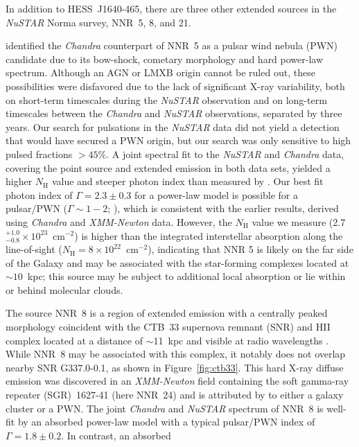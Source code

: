 \documentclass[iop,revtex4]{emulateapj}
\begin{document}
In addition to HESS~J1640-465, there are three other extended sources in the \textit{NuSTAR} Norma survey, NNR~5, 8, and 21.  \par
\citet{jakobsen14} identified the \textit{Chandra} counterpart of NNR~5 as a pulsar wind nebula (PWN) candidate due to its bow-shock, cometary morphology and hard power-law spectrum.  Although an AGN or LMXB origin cannot be ruled out, these possibilities were disfavored due to the lack of significant X-ray variability, both on short-term timescales during the \textit{NuSTAR} observation and on long-term timescales between the \textit{Chandra} and \textit{NuSTAR} observations, separated by three years.  Our search for pulsations in the \textit{NuSTAR} data did not yield a detection that would have secured a PWN origin, but our search was only sensitive to high pulsed fractions $>45$\%. A joint spectral fit to the \textit{NuSTAR} and \textit{Chandra} data, covering the point source and extended emission in both data sets, yielded a higher $N_{\mathrm{H}}$ value and steeper photon index than measured by \citet{jakobsen14}.  Our best fit photon index of $\Gamma=2.3\pm0.3$ for a power-law model is possible for a pulsar/PWN ($\Gamma\sim1-2$; \citealt{kargaltsev08}), which is consistent with the earlier results, derived using \textit{Chandra} and \textit{XMM-Newton} data.  However, the $N_{\mathrm{H}}$ value we measure (2.7$^{+1.0}_{-0.8}\times10^{23}$~cm$^{-2}$) is higher than the integrated interstellar absorption along the line-of-sight ($N_{\mathrm{H}} = 8\times10^{22}$~cm$^{-2}$), indicating that NNR 5 is likely on the far side of the Galaxy and may be associated with the star-forming complexes located at $\sim10$~kpc; this source may be subject to additional local absorption or lie within or behind molecular clouds. \par
The source NNR~8 is a region of extended emission with a centrally peaked morphology coincident with the CTB~33 supernova remnant (SNR) and H{\small II} complex located at a distance of $\sim$11~kpc and visible at radio wavelengths \citep{sarma97}.  While NNR~8 may be associated with this complex, it notably does not overlap nearby SNR G337.0-0.1, as shown in Figure~\ref{fig:ctb33}. This hard X-ray diffuse emission was discovered in an \textit{XMM-Newton} field containing the soft gamma-ray repeater (SGR)~1627-41 (here NNR~24) and is attributed by \citet{esposito09} to either a galaxy cluster or a PWN. 
The joint \textit{Chandra} and \textit{NuSTAR} spectrum of NNR~8 is well-fit by an absorbed power-law model with a typical pulsar/PWN index of $\Gamma=1.8\pm0.2$.  In contrast, an absorbed
\end{document}
